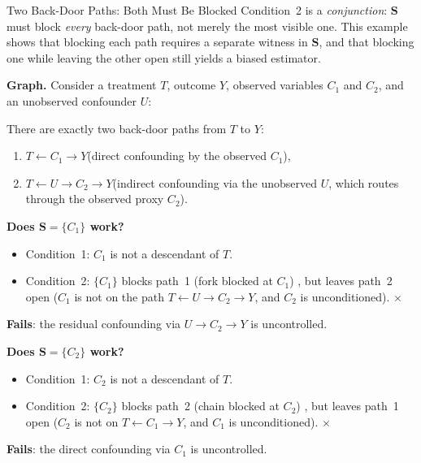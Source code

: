 \documentclass[master.tex]{subfiles}
\begin{document}
\begin{example}{Two Back-Door Paths: Both Must Be Blocked}
\label{w3:ex:twopaths}
Condition~2 is a \emph{conjunction}: $\mathbf{S}$ must block
\emph{every} back-door path, not merely the most visible one.  This
example shows that blocking each path requires a separate witness in
$\mathbf{S}$, and that blocking one while leaving the other open still
yields a biased estimator.

\medskip
\noindent\textbf{Graph.}
Consider a treatment $T$, outcome $Y$, observed variables $C_1$ and
$C_2$, and an unobserved confounder $U$:

\begin{center}
\end{center}

\noindent
There are exactly two back-door paths from $T$ to $Y$:
\begin{enumerate}
  \item $T \leftarrow C_1 \to Y$\quad (direct confounding by the observed $C_1$),
  \item $T \leftarrow U \to C_2 \to Y$\quad (indirect confounding via the
        unobserved $U$, which routes through the observed proxy $C_2$).
\end{enumerate}

\medskip
\noindent\textbf{Does $\mathbf{S} = \{C_1\}$ work?}
\begin{itemize}
  \item Condition~1: $C_1$ is not a descendant of $T$. \checkmark
  \item Condition~2: $\{C_1\}$ blocks path~1 (fork blocked at $C_1$) \checkmark,
        but leaves path~2 open ($C_1$ is not on the path
        $T \leftarrow U \to C_2 \to Y$, and $C_2$ is unconditioned). $\times$
\end{itemize}
\textbf{Fails}: the residual confounding via $U \to C_2 \to Y$ is uncontrolled.

\medskip
\noindent\textbf{Does $\mathbf{S} = \{C_2\}$ work?}
\begin{itemize}
  \item Condition~1: $C_2$ is not a descendant of $T$. \checkmark
  \item Condition~2: $\{C_2\}$ blocks path~2 (chain blocked at $C_2$) \checkmark,
        but leaves path~1 open ($C_2$ is not on $T \leftarrow C_1 \to Y$,
        and $C_1$ is unconditioned). $\times$
\end{itemize}
\textbf{Fails}: the direct confounding via $C_1$ is uncontrolled.


\end{example}
\end{document}
